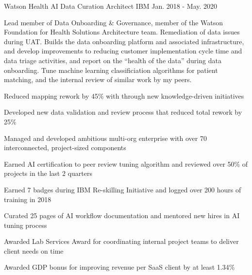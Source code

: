 \begin{cventries}
  \cventry
    {Watson Health} %
    {AI Data Curation Architect} %
    {IBM} %
    {Jan. 2018 - May. 2020} %
    {
      \begin{cvparagraph}
        Lead member of Data Onboarding \& Governance, member of the Watson Foundation for Health Solutions Architecture team.  Remediation of data issues during UAT.  Builds the data onboarding platform and associated infrastructure, and develop improvements to reducing customer implementation cycle time and data triage activities, and report on the “health of the data” during data onboarding.  Tune machine learning classificiation algorithms for patient matching, and the internal review of similar work by my peers.
      \end{cvparagraph}
      \begin{cvitems} %
        \item {Reduced mapping rework by 45\% with through new knowledge-driven initiatives}
        \item {Developed new data validation and review process that reduced total rework by 25\%}
        \item {Managed and developed ambitious multi-org enterprise with over 70 interconnected, project-sized components}
        \item {Earned AI certification to peer review tuning algorithm and reviewed over 50\% of projects in the last 2 quarters}
        \item {Earned 7 badges during IBM Re-skilling Initiative and logged over 200 hours of training in 2018}
        \item {Curated 25 pages of AI workflow documentation and mentored new hires in AI tuning process}
        \item {Awarded Lab Services Award for coordinating internal project teams to deliver client needs on time}
        \item {Awarded GDP bonus for improving revenue per SaaS client by at least 1.34\%}
      \end{cvitems}
    }


\end{cventries}
